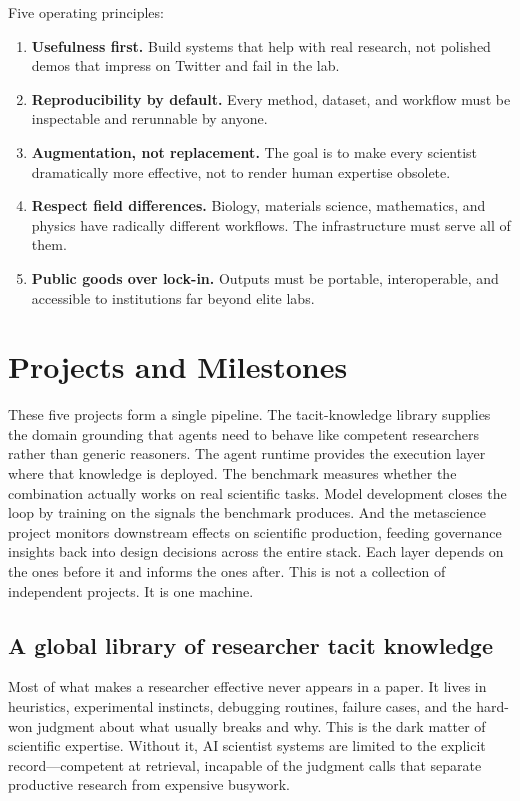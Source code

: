 \documentclass[11pt]{article}
\begin{document}
Five operating principles:

\begin{enumerate}
  \item \textbf{Usefulness first.} Build systems that help with real research, not polished demos that impress on Twitter and fail in the lab.
  \item \textbf{Reproducibility by default.} Every method, dataset, and workflow must be inspectable and rerunnable by anyone.
  \item \textbf{Augmentation, not replacement.} The goal is to make every scientist dramatically more effective, not to render human expertise obsolete.
  \item \textbf{Respect field differences.} Biology, materials science, mathematics, and physics have radically different workflows. The infrastructure must serve all of them.
  \item \textbf{Public goods over lock-in.} Outputs must be portable, interoperable, and accessible to institutions far beyond elite labs.
\end{enumerate}

\section{Projects and Milestones}

These five projects form a single pipeline. The tacit-knowledge library supplies the domain grounding that agents need to behave like competent researchers rather than generic reasoners. The agent runtime provides the execution layer where that knowledge is deployed. The benchmark measures whether the combination actually works on real scientific tasks. Model development closes the loop by training on the signals the benchmark produces. And the metascience project monitors downstream effects on scientific production, feeding governance insights back into design decisions across the entire stack. Each layer depends on the ones before it and informs the ones after. This is not a collection of independent projects. It is one machine.

\subsection{A global library of researcher tacit knowledge}

Most of what makes a researcher effective never appears in a paper. It lives in heuristics, experimental instincts, debugging routines, failure cases, and the hard-won judgment about what usually breaks and why. This is the dark matter of scientific expertise. Without it, AI scientist systems are limited to the explicit record---competent at retrieval, incapable of the judgment calls that separate productive research from expensive busywork.
\end{document}
